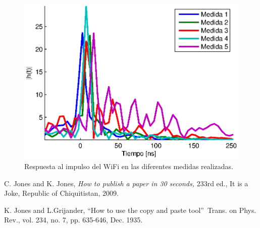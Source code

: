 \documentclass[10pt,conference,a4paper]{IEEEtran}
\begin{document}
\begin{figure}[htb]
    \centering
    \includegraphics[width=\columnwidth]{figuras/respuesta_impulso_wifi.eps}
    \caption{Respuesta al impulso del WiFi en las diferentes medidas realizadas.}
    \label{fig:respuesta_impulso_wifi}
\end{figure}


\begin{thebibliography}{9}                                                                                                %
    C. Jones and K. Jones, \emph{How to publish a paper in 30
seconds,} 233rd ed., It is a Joke, Republic of Chiquitistan, 2009.

    K. Jones and L.Grijander, \textquotedblleft How to use
the copy and paste tool\textquotedblright\ Trans. on Phys. Rev., vol. 234, no.
7, pp. 635-646, Dec. 1935.
\end{thebibliography}
\end{document}
